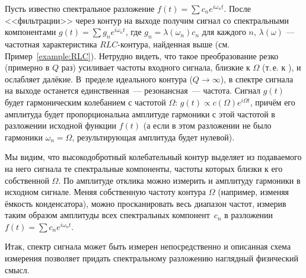 Пусть известно спектральное разложение $f(t)=\sum c_n e^{i\omega_n t}$.
После <<фильтрации>> через контур на выходе получим сигнал со
спектральными компонентами $g(t)=\sum g_n e^{i\omega_n t}$,
где $g_n = \lambda(\omega_n) c_n$ для каждого $n$,
$\lambda(\omega)$ --- частотная характеристика $RLC$-контура, найденная
выше (см. Пример~\ref{example:RLC}). Нетрудно видеть, что такое преобразование резко
(примерно в $Q$ раз) усиливает частоты входного сигнала, близкие к
$\Omega$ (т.\,е. к ), и ослабляет далёкие.
В~пределе идеального контура ($Q\to \infty$), в спектре сигнала на выходе
останется единственная~--- резонансная~--- частота.
Сигнал $g(t)$ будет гармоническим колебанием с частотой $\Omega$:
$g(t) \propto c(\Omega) e^{i\Omega t}$,
причём его амплитуда будет пропорциональна амплитуде гармоники с этой
частотой в разложении исходной функции $f(t)$ (а если в этом разложении не было
гармоники $\omega_n=\Omega$, результирующая амплитуда будет нулевой).

Мы видим, что высокодобротный колебательный контур 
выделяет из подаваемого
на него сигнала те спектральные компоненты, частоты которых близки к
его собственной $\Omega$. По амплитуде отклика можно измерить и амплитуду
гармоники в исходном сигнале. Меняя собственную частоту контура $\Omega$
(например, изменяя ёмкость конденсатора), можно просканировать весь
диапазон частот, измерив таким образом амплитуды всех спектральных
компонент~$c_n$ в разложении $f(t)=\sum c_n e^{i\omega_n t}$. 

Итак,
спектр сигнала может быть измерен непосредственно и описанная схема измерения
позволяет придать спектральному разложению наглядный физический смысл.

